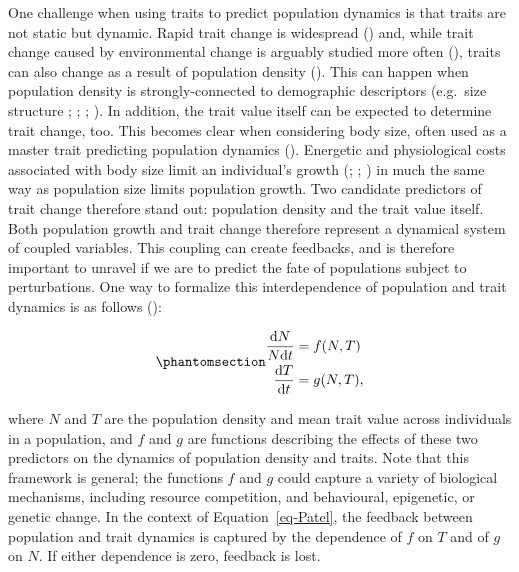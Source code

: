 \documentclass[
  letterpaper,
  DIV=11,
  numbers=noendperiod]{scrartcl}
\begin{document}
One challenge when using traits to predict population dynamics is that
traits are not static but dynamic. Rapid trait change is widespread
() and, while
trait change caused by environmental change is arguably studied more
often (), traits
can also change as a result of population density
(). This can happen when
population density is strongly-connected to demographic descriptors
(e.g.~size structure ;
;
;
). In addition, the
trait value itself can be expected to determine trait change, too. This
becomes clear when considering body size, often used as a master trait
predicting population dynamics (). Energetic and physiological costs associated with
body size limit an individual's growth (; ;
) in much the same way as
population size limits population growth. Two candidate predictors of
trait change therefore stand out: population density and the trait value
itself. Both population growth and trait change therefore represent a
dynamical system of coupled variables. This coupling can create
feedbacks, and is therefore important to unravel if we are to predict
the fate of populations subject to perturbations. One way to formalize
this interdependence of population and trait dynamics is as follows
():

\begin{equation}\phantomsection\label{eq-Patel}{\begin{split}
        \frac{\text{d}N}{N\text{d}t} & = f(N, T) \\
        \frac{\text{d}T}{\text{d}t} & = g(N, T), \\
    \end{split}
}\end{equation}

where \(N\) and \(T\) are the population density and mean trait value
across individuals in a population, and \(f\) and \(g\) are functions
describing the effects of these two predictors on the dynamics of
population density and traits. Note that this framework is general; the
functions \(f\) and \(g\) could capture a variety of biological
mechanisms, including resource competition, and behavioural, epigenetic,
or genetic change. In the context of Equation~\ref{eq-Patel}, the
feedback between population and trait dynamics is captured by the
dependence of \(f\) on \(T\) and of \(g\) on \(N\). If either dependence
is zero, feedback is lost.
\end{document}
